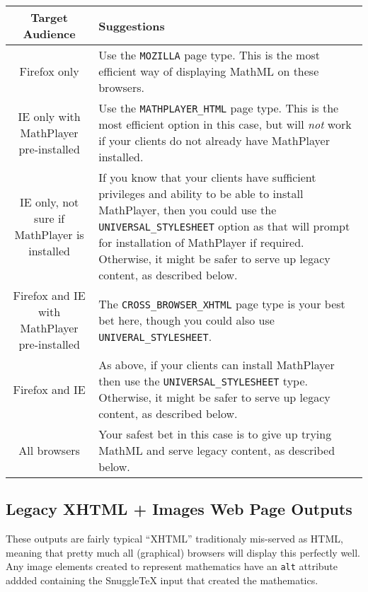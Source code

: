 \begin{tabular}{|c|l|}
\hline
Target Audience & Suggestions \\
\hline
Firefox only &
Use the \verb|MOZILLA| page type. This is the most efficient %
way of displaying MathML on these browsers. \\
\hline
IE only with MathPlayer pre-installed &
Use the \verb|MATHPLAYER_HTML| page type. This is the most efficient %
option in this case, but will \emph{not} work if your clients do not %
already have MathPlayer installed. \\
\hline
IE only, not sure if MathPlayer is installed &
If you know that your clients have sufficient privileges and ability to be able to %
install MathPlayer, then you could use the \verb|UNIVERSAL_STYLESHEET| option %
as that will prompt for installation of MathPlayer if required. %
Otherwise, it might be safer to serve up legacy content, as described below. \\
\hline
Firefox and IE with MathPlayer pre-installed &
The \verb|CROSS_BROWSER_XHTML| page type is your best bet here, though %
you could also use \verb|UNIVERAL_STYLESHEET|. \\
\hline
Firefox and IE &
As above, if your clients can install MathPlayer then use the %
\verb|UNIVERSAL_STYLESHEET| type. Otherwise, it might be safer %
to serve up legacy content, as described below. \\
\hline
All browsers &
Your safest bet in this case is to give up trying MathML and %
serve legacy content, as described below. \\
\hline
\end{tabular}

\subsection*{Legacy XHTML + Images Web Page Outputs}

These outputs are fairly typical ``XHTML'' traditionaly mis-served as HTML,
meaning that pretty much all (graphical) browsers will display this perfectly
well. Any image elements created to represent mathematics have an \verb|alt|
attribute addded containing the SnuggleTeX input that created the mathematics.
